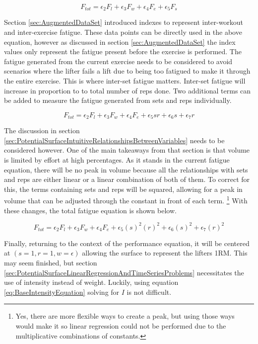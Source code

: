 \begin{equation*}
	F_{tot}=\epsilon_2 F_l+\epsilon_3 F_w+\epsilon_4 F_e+\epsilon_5 F_s
\end{equation*}

Section \ref{sec:AugmentedDataSet} introduced indexes to represent inter-workout and inter-exercise fatigue. These data points can be directly used in the above equation, however as discussed in section \ref{sec:AugmentedDataSet} the index values only represent the fatigue present before the exercise is performed. The fatigue generated from the current exercise needs to be considered to avoid scenarios where the lifter fails a lift due to being too fatigued to make it through the entire exercise. This is where inter-set fatigue matters. Inter-set fatigue will increase in proportion to to total number of reps done. Two additional terms can be added to measure the fatigue generated from sets and reps individually.

\begin{equation*}
	F_{tot}=\epsilon_2 F_l+\epsilon_3 F_w+\epsilon_4 F_e+\epsilon_5 sr+\epsilon_6 s+\epsilon_7 r
\end{equation*}

The discussion in section \ref{sec:PotentialSurfaceIntuitiveRelationshipsBetweenVariables} needs to be considered however. One of the main takeaways from that section is that volume is limited by effort at high percentages. As it stands in the current fatigue equation, there will be no peak in volume because all the relationships with sets and reps are either linear or a linear combination of both of them. To correct for this, the terms containing sets and reps will be squared, allowing for a peak in volume that can be adjusted through the constant in front of each term. \footnote{Yes, there are more flexible ways to create a peak, but using those ways would make it so linear regression could not be performed due to the multiplicative combinations of constants.} With these changes, the total fatigue equation is shown below.

\begin{equation}
	\label{eq:TotalFatigue}
	F_{tot}=\epsilon_2 F_l+\epsilon_3 F_w+\epsilon_4 F_e+\epsilon_5 (s)^2(r)^2+\epsilon_6 (s)^2+\epsilon_7 (r)^2
\end{equation}

Finally, returning to the context of the performance equation, it will be centered at $(s=1,r=1,w=\epsilon)$ allowing the surface to represent the lifters 1RM. This may seem finished, but section \ref{sec:PotentialSurfaceLinearRegressionAndTimeSeriesProblems} necessitates the use of intensity instead of weight. Luckily, using equation \ref{eq:BaseIntensityEquation} solving for $I$ is not difficult. 

